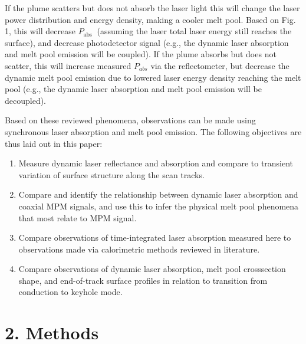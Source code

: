 \documentclass[10pt]{article}
\begin{document}
If the plume scatters but does not absorb the laser light this will change the laser power distribution and energy density, making a cooler melt pool. Based on Fig. 1, this will decrease $P_{\text {abs }}$ (assuming the laser total laser energy still reaches the surface), and decrease photodetector signal (e.g., the dynamic laser absorption and melt pool emission will be coupled). If the plume absorbs but does not scatter, this will increase measured $P_{a b s}$ via the reflectometer, but decrease the dynamic melt pool emission due to lowered laser energy density reaching the melt pool (e.g., the dynamic laser absorption and melt pool emission will be decoupled).

Based on these reviewed phenomena, observations can be made using synchronous laser absorption and melt pool emission. The following objectives are thus laid out in this paper:

\begin{enumerate}
  \item Measure dynamic laser reflectance and absorption and compare to transient variation of surface structure along the scan tracks.

  \item Compare and identify the relationship between dynamic laser absorption and coaxial MPM signals, and use this to infer the physical melt pool phenomena that most relate to MPM signal.

  \item Compare observations of time-integrated laser absorption measured here to observations made via calorimetric methods reviewed in literature.

  \item Compare observations of dynamic laser absorption, melt pool crosssection shape, and end-of-track surface profiles in relation to transition from conduction to keyhole mode.

\end{enumerate}

\section*{2. Methods}
\end{document}
